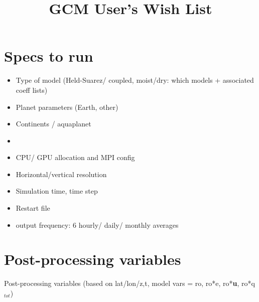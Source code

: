 \documentclass{report}
\title{GCM User's Wish List}
\author{ }
\begin{document}
\maketitle


\section{Specs to run}\label{}
\begin{itemize}
    \item Type of model (Held-Suarez/ coupled, moist/dry: which models + associated coeff lists)
    \item Planet parameters (Earth, other)
    \item Continents / aquaplanet
    \item 
    \item CPU/ GPU allocation and MPI config
    \item Horizontal/vertical resolution
    \item Simulation time, time step 
    \item Restart file
    \item output frequency: 6 hourly/ daily/ monthly averages 
\end{itemize}

\section{Post-processing variables}\label{}

Post-processing variables (based on lat/lon/z,t, model vars = ro, ro*e, ro*\textbf{u}, ro*q$_{tot}$)
\end{document}
